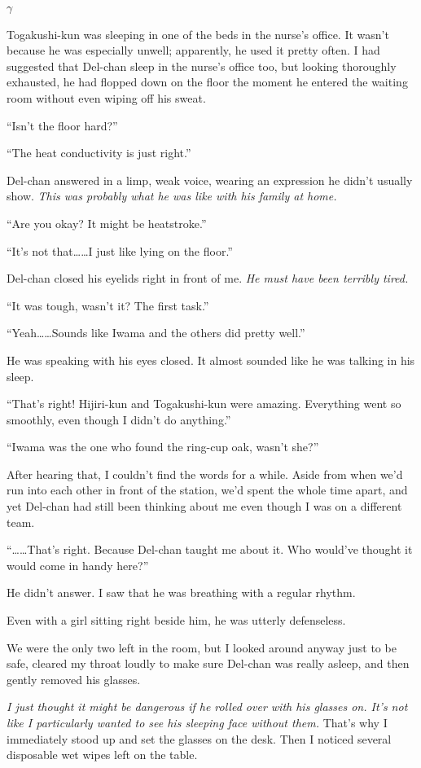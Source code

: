 \documentclass[
    a4paper,
    12pt,
    twoside,
    openany,
    UTF8,
    fontset=windows
]{ctexbook}
\begin{document}
$\gamma$

Togakushi-kun was sleeping in one of the beds in the nurse's office. It wasn't because he was especially unwell; apparently, he used it pretty often. I had suggested that Del-chan sleep in the nurse's office too, but looking thoroughly exhausted, he had flopped down on the floor the moment he entered the waiting room without even wiping off his sweat.

``Isn't the floor hard?''

``The heat conductivity is just right.''

Del-chan answered in a limp, weak voice, wearing an expression he didn't usually show. \textit{This was probably what he was like with his family at home.}

``Are you okay? It might be heatstroke.''

``It's not that\dots\dots I just like lying on the floor.''

Del-chan closed his eyelids right in front of me. \textit{He must have been terribly tired.}

``It was tough, wasn't it? The first task.''

``Yeah\dots\dots Sounds like Iwama and the others did pretty well.''

He was speaking with his eyes closed. It almost sounded like he was talking in his sleep.

``That's right! Hijiri-kun and Togakushi-kun were amazing. Everything went so smoothly, even though I didn't do anything.''

``Iwama was the one who found the ring-cup oak, wasn't she?''

After hearing that, I couldn't find the words for a while. Aside from when we'd run into each other in front of the station, we'd spent the whole time apart, and yet Del-chan had still been thinking about me even though I was on a different team.

``\dots\dots That's right. Because Del-chan taught me about it. Who would've thought it would come in handy here?''

He didn't answer. I saw that he was breathing with a regular rhythm.

Even with a girl sitting right beside him, he was utterly defenseless.

We were the only two left in the room, but I looked around anyway just to be safe, cleared my throat loudly to make sure Del-chan was really asleep, and then gently removed his glasses.

\textit{I just thought it might be dangerous if he rolled over with his glasses on. It's not like I particularly wanted to see his sleeping face without them.} That's why I immediately stood up and set the glasses on the desk. Then I noticed several disposable wet wipes left on the table.
\end{document}
